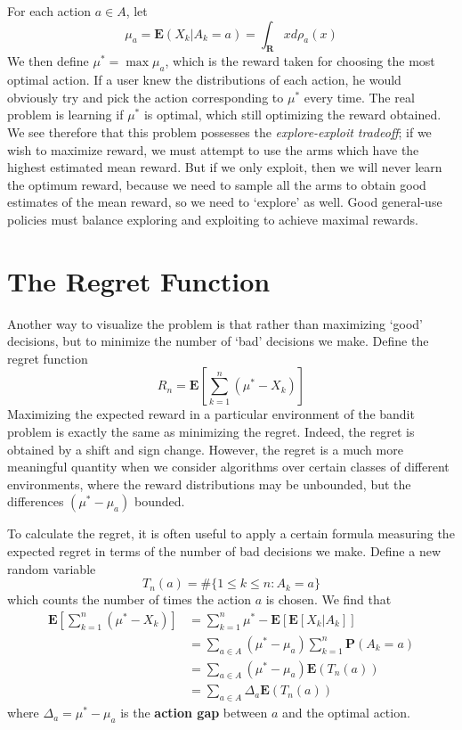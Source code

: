 For each action $a \in A$, let
%
\[ \mu_a = \mathbf{E}(X_k | A_k = a) = \int_\mathbf{R} x d \rho_a(x) \]
%
We then define $\mu^* = \max \mu_a$, which is the reward taken for choosing the most optimal action. If a user knew the distributions of each action, he would obviously try and pick the action corresponding to $\mu^*$ every time. The real problem is learning if $\mu^*$ is optimal, which still optimizing the reward obtained. We see therefore that this problem possesses the {\it explore-exploit tradeoff}; if we wish to maximize reward, we must attempt to use the arms which have the highest estimated mean reward. But if we only exploit, then we will never learn the optimum reward, because we need to sample all the arms to obtain good estimates of the mean reward, so we need to `explore' as well. Good general-use policies must balance exploring and exploiting to achieve maximal rewards.

\section{The Regret Function}

Another way to visualize the problem is that rather than maximizing `good' decisions, but to minimize the number of `bad' decisions we make. Define the regret function
%
\[ R_n = \mathbf{E} \left[\sum_{k = 1}^n (\mu^* - X_k) \right] \]
%
Maximizing the expected reward in a particular environment of the bandit problem is exactly the same as minimizing the regret. Indeed, the regret is obtained by a shift and sign change. However, the regret is a much more meaningful quantity when we consider algorithms over certain classes of different environments, where the reward distributions may be unbounded, but the differences $(\mu^* - \mu_a)$ bounded.

To calculate the regret, it is often useful to apply a certain formula measuring the expected regret in terms of the number of bad decisions we make. Define a new random variable
%
\[ T_n(a) = \# \{ 1 \leq k \leq n : A_k = a \} \]
%
which counts the number of times the action $a$ is chosen. We find that
%
\begin{align*}
    \mathbf{E} \left[\sum_{k = 1}^n (\mu^* - X_k) \right] &= \sum_{k = 1}^n \mu^* - \mathbf{E}[ \mathbf{E}[X_k | A_k] ]\\
    &= \sum_{a \in A} (\mu^* - \mu_a) \sum_{k = 1}^n \mathbf{P}(A_k = a)\\
    &= \sum_{a \in A} (\mu^* - \mu_a) \mathbf{E}(T_n(a))\\
    &= \sum_{a \in A} \Delta_a \mathbf{E}(T_n(a))
\end{align*}
%
where $\Delta_a = \mu^* - \mu_a$ is the {\bf action gap} between $a$ and the optimal action.

